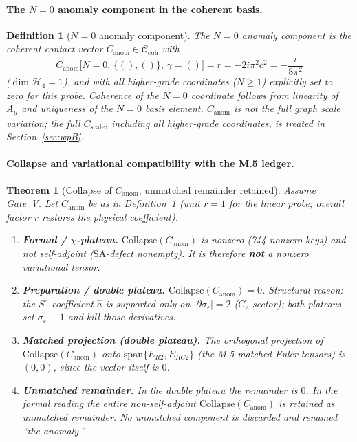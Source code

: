 \documentclass{article}
\newtheorem{theorem}[proposition]{Theorem}
\newtheorem{definition}[proposition]{Definition}
\theoremstyle{remark}
\newcommand{\sigeps}{\sigma_\varepsilon}
\newcommand{\Ccoh}{\mathcal C_{\mathrm{coh}}}
\newcommand{\Coll}{\mathrm{Collapse}}
\begin{document}
\paragraph{The $N=0$ anomaly component in the coherent basis.}
\begin{definition}[$N=0$ anomaly component]
\label{def:M6-Canom}
The \emph{$N=0$ anomaly component} is the coherent contact vector $C_{\mathrm{anom}}\in\Ccoh$ with
\[
C_{\mathrm{anom}}\bigl[N=0,\,\{(),()\},\,\gamma=()\bigr]=r=-2i\pi^2 c^2=-\frac{i}{8\pi^2}
\]
($\dim\mathcal H_4=1$), and with all higher-grade coordinates ($N\ge1$) \emph{explicitly set to zero for this probe}.
Coherence of the $N=0$ coordinate follows from linearity of $A_\mu$ and uniqueness of the $N=0$ basis element.
$C_{\mathrm{anom}}$ is not the full graph scale variation; the full $C_{\mathrm{scale}}$, including all higher-grade coordinates, is treated in Section~\ref{sec:wpB}.
\end{definition}

\paragraph{Collapse and variational compatibility with the M.5 ledger.}
\begin{theorem}[Collapse of $C_{\mathrm{anom}}$; unmatched remainder retained]
\label{thm:M6-collapse}
Assume Gate~V. Let $C_{\mathrm{anom}}$ be as in Definition~\ref{def:M6-Canom} (unit $r=1$ for the linear probe; overall factor $r$ restores the physical coefficient).
\begin{enumerate}
\item \textbf{Formal / $\chi$-plateau.} $\Coll(C_{\mathrm{anom}})$ is nonzero (744 nonzero keys) and \emph{not} self-adjoint ($\mathrm{SA}$-defect nonempty). It is therefore \textbf{not} a nonzero variational tensor.
\item \textbf{Preparation / double plateau.} $\Coll(C_{\mathrm{anom}})=0$.
Structural reason: the $S^2$ coefficient $\hat a$ is supported only on $|\partial\sigeps|=2$ ($C_2$ sector); both plateaus set $\sigeps\equiv1$ and kill those derivatives.
\item \textbf{Matched projection (double plateau).} The orthogonal projection of $\Coll(C_{\mathrm{anom}})$ onto $\mathrm{span}\{E_{R2},E_{RC2}\}$ (the M.5 matched Euler tensors) is $(0,0)$, since the vector itself is $0$.
\item \textbf{Unmatched remainder.} In the double plateau the remainder is $0$.
In the formal reading the \emph{entire} non-self-adjoint $\Coll(C_{\mathrm{anom}})$ is retained as unmatched remainder.
No unmatched component is discarded and renamed ``the anomaly.''
\end{enumerate}
\end{theorem}
\end{document}
